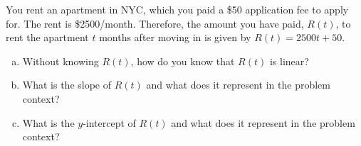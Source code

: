 \documentclass[12pt,letterpaper]{exam}
\begin{document}
\begin{questions}
\question[8] You rent an apartment in NYC, which you paid a \$50 application fee to apply for. The rent is \$2500/month. Therefore, the amount you have paid, $R(t)$, to rent the apartment $t$ months after moving in is given by $R(t)= 2500t + 50$.
	\begin{enumerate}[(a)]
	\item Without knowing $R(t)$, how do you know that $R(t)$ is linear? \vfill
	\item What is the slope of $R(t)$ and what does it represent in the problem context? \vfill
	\item What is the $y$-intercept of $R(t)$ and what does it represent in the problem context? \vfill
	\end{enumerate}

\end{questions}
\end{document}
